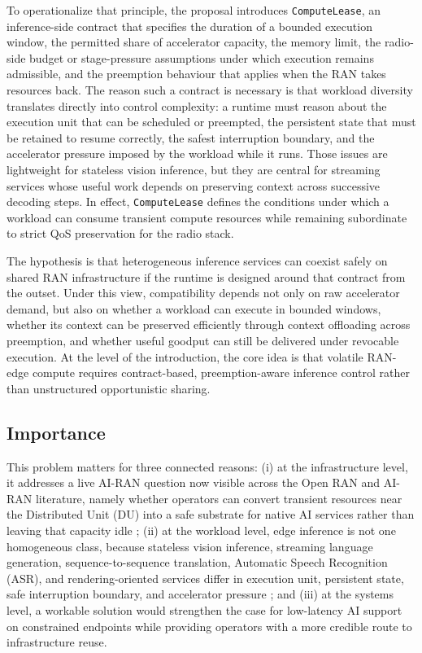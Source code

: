 \documentclass[a4paper,11pt]{article}
\begin{document}
To operationalize that principle, the proposal introduces \texttt{ComputeLease}, an inference-side contract that specifies the duration of a bounded execution window, the permitted share of accelerator capacity, the memory limit, the radio-side budget or stage-pressure assumptions under which execution remains admissible, and the preemption behaviour that applies when the RAN takes resources back. The reason such a contract is necessary is that workload diversity translates directly into control complexity: a runtime must reason about the execution unit that can be scheduled or preempted, the persistent state that must be retained to resume correctly, the safest interruption boundary, and the accelerator pressure imposed by the workload while it runs. Those issues are lightweight for stateless vision inference, but they are central for streaming services whose useful work depends on preserving context across successive decoding steps. In effect, \texttt{ComputeLease} defines the conditions under which a workload can consume transient compute resources while remaining subordinate to strict QoS preservation for the radio stack.

The hypothesis is that heterogeneous inference services can coexist safely on shared RAN infrastructure if the runtime is designed around that contract from the outset. Under this view, compatibility depends not only on raw accelerator demand, but also on whether a workload can execute in bounded windows, whether its context can be preserved efficiently through context offloading across preemption, and whether useful goodput can still be delivered under revocable execution. At the level of the introduction, the core idea is that volatile RAN-edge compute requires contract-based, preemption-aware inference control rather than unstructured opportunistic sharing.

\subsection{Importance}

This problem matters for three connected reasons: (i) at the infrastructure level, it addresses a live AI-RAN question now visible across the Open RAN and AI-RAN literature, namely whether operators can convert transient resources near the Distributed Unit (DU) into a safe substrate for native AI services rather than leaving that capacity idle \cite{beyond,airan}; (ii) at the workload level, edge inference is not one homogeneous class, because stateless vision inference, streaming language generation, sequence-to-sequence translation, Automatic Speech Recognition (ASR), and rendering-oriented services differ in execution unit, persistent state, safe interruption boundary, and accelerator pressure \cite{cora,slaairan,pagedattention,distserve}; and (iii) at the systems level, a workable solution would strengthen the case for low-latency AI support on constrained endpoints while providing operators with a more credible route to infrastructure reuse.
\end{document}
